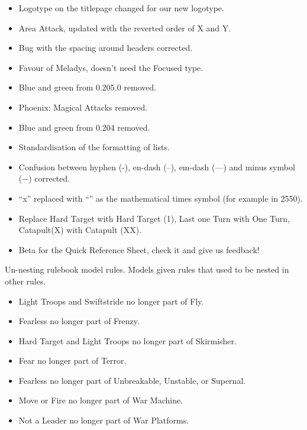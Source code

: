 

\subtitle{0.205.2}

\begin{itemize}
\item Logotype on the titlepage changed for our new logotype.
\item Area Attack, updated with the reverted order of X and Y.
\item Bug with the spacing around headers corrected.
\item Favour of Meladys, doesn't need the Focused type.
\end{itemize}

\subtitle{0.205.1}

\begin{itemize}
\item Blue and green from 0.205.0 removed.
\item Phoenix: Magical Attacks removed.
\end{itemize}

\subtitle{0.205.0}

\begin{itemize}
\item Blue and green from 0.204 removed.
\item Standardisation of the formatting of lists.
\item Confusion between hyphen (-), en-dash (--), em-dash (---) and minus symbol (−) corrected.
\item \enquote{x} replaced with \enquote{\timess{}} as the mathematical times symbol (for example in 25\timess{}50).
\item Replace Hard Target with Hard Target (1), Last one Turn with One Turn, Catapult(X) with Catapult (X\timess{}X).
\item Beta for the Quick Reference Sheet, check it and give us feedback!
\end{itemize}

Un-nesting rulebook model rules. Models given rules that used to be nested in other rules.
\begin{itemize}
\item Light Troops and Swiftstride no longer part of Fly.
\item Fearless no longer part of Frenzy.
\item Hard Target and Light Troops no longer part of Skirmisher.
\item Fear no longer part of Terror.
\item Fearless no longer part of Unbreakable, Unstable, or Supernal.
\item Move or Fire no longer part of War Machine.
\item Not a Leader no longer part of War Platforms.
\end{itemize}

